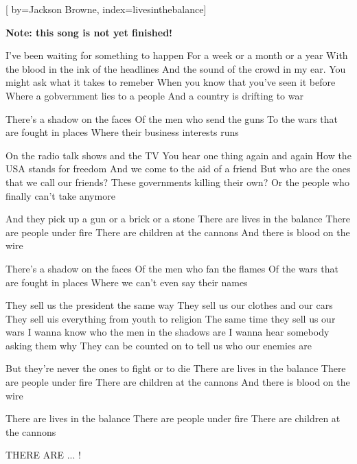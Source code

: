 

[%
    by={Jackson Browne},
    index={livesinthebalance}]


    \label{livesinthebalance}

    \textbf{Note: this song is not yet finished!}

    \beginverse
        I've been waiting for something to happen
        For a week or a month or a year
        With the blood in the ink of the headlines
        And the sound of the crowd in my ear.
        You might ask what it takes to remeber
        When you know that you've seen it before
        Where a gobvernment lies to a people
        And a country is drifting to war
    \endverse

    \beginchorus
        There's a shadow on the faces
        Of the men who send the guns
        To the wars that are fought in places
        Where their business interests runs
    \endchorus

    \beginverse
        On the radio talk shows and the TV
        You hear one thing again and again
        How the USA stands for freedom
        And we come to the aid of a friend
        But who are the ones that we call our friends?
        These governments killing their own?
        Or the people who finally can't take anymore
    \endverse

    \beginchorus
        And they pick up a gun or a brick or a stone
        There are lives in the balance 
        There are people under fire 
        There are children at the cannons 
        And there is blood on the wire
    \endchorus

    \beginchorus
        There's a shadow on the faces
        Of the men who fan the flames
        Of the wars that are fought in places
        Where we can't even say their names
    \endchorus

    \beginverse
        They sell us the president the same way
        They sell us our clothes and our cars
        They sell uis everything from youth to religion
        The same time they sell us our wars
        I wanna know who the men in the shadows are
        I wanna hear somebody asking them why
        They can be counted on to tell us who our enemies are
    \endverse

    \beginchorus
        But they're never the ones to fight or to die
        There are lives in the balance 
        There are people under fire 
        There are children at the cannons 
        And there is blood on the wire
    \endchorus

    \beginchorus
        There are lives in the balance
        There are people under fire
        There are children at the cannons

        THERE ARE ... !
    \endchorus
\endsong

